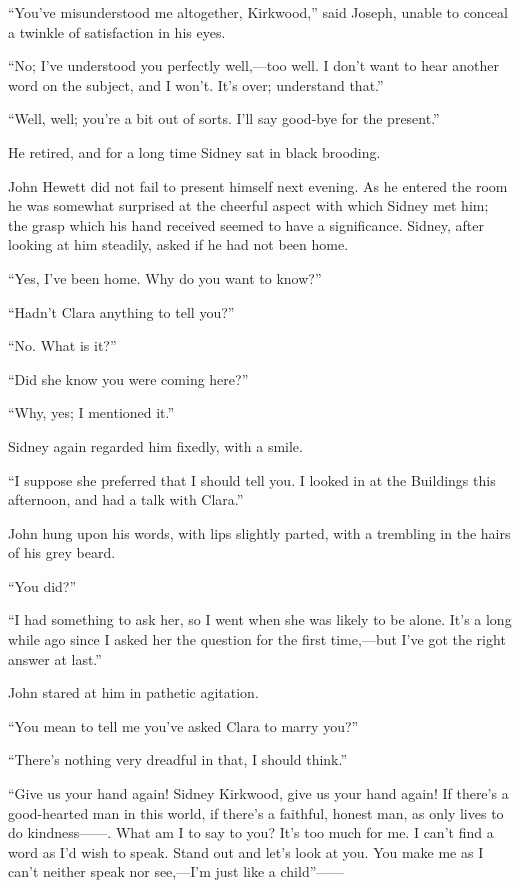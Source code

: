 ``You've misunderstood me altogether, Kirkwood,'' said Joseph, unable to
conceal a twinkle of satisfaction in his eyes.

``No; I've understood you perfectly well,---too well. I don't want to
hear another word on the subject, and I won't. It's over; understand
that.''

``Well, well; you're a bit out of sorts. I'll say good-bye for the
present.''

He retired, and for a long time Sidney sat in black brooding.

John Hewett did not fail to present
{\protect\hypertarget{114}{}{}}himself next evening. As he entered the
room he was somewhat surprised at the cheerful aspect with which Sidney
met him; the grasp which his hand received seemed to have a
significance. Sidney, after looking at him steadily, asked if he had not
been home.

``Yes, I've been home. Why do you want to know?''

``Hadn't Clara anything to tell you?''

``No. What is it?''

``Did she know you were coming here?''

``Why, yes; I mentioned it.''

Sidney again regarded him fixedly, with a smile.

``I suppose she preferred that I should tell you. I looked in at the
Buildings this afternoon, and had a talk with Clara.''

John hung upon his words, with lips slightly parted, with a trembling in
the hairs of his grey beard.

``You did?''

``I had something to ask her, so I went when she was likely to be alone.
It's a long while ago since I asked her the question for the first
time,---but I've got the right answer at last.''

{\protect\hypertarget{115}{}{}}John stared at him in pathetic agitation.

``You mean to tell me you've asked Clara to marry you?''

``There's nothing very dreadful in that, I should think.''

``Give us your hand again! Sidney Kirkwood, give us your hand again! If
there's a good-hearted man in this world, if there's a faithful, honest
man, as only lives to do kindness{{------}}. What am I to say to you?
It's too much for me. I can't find a word as I'd wish to speak. Stand
out and let's look at you. You make me as I can't neither speak nor
see,---I'm just like a child''{{------}}

